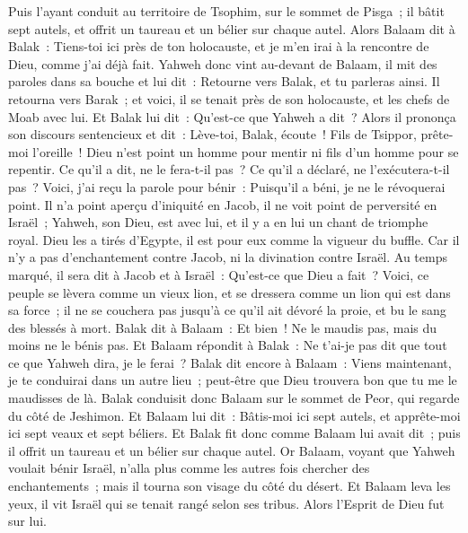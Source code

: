 \begin{multicols}{2}
Puis l'ayant conduit au territoire de Tsophim, sur le sommet de Pisga~; il bâtit sept autels, et offrit un taureau et un bélier sur chaque autel.
Alors Balaam dit à Balak~: Tiens-toi ici près de ton holocauste, et je m'en irai à la rencontre de Dieu, comme j'ai déjà fait.
Yahweh donc vint au-devant de Balaam, il mit des paroles dans sa bouche et lui dit~: Retourne vers Balak, et tu parleras ainsi.
Il retourna vers Barak~; et voici, il se tenait près de son holocauste, et les chefs de Moab avec lui. Et Balak lui dit~: Qu'est-ce que Yahweh a dit~?
Alors il prononça son discours sentencieux et dit~: Lève-toi, Balak, écoute~! Fils de Tsippor, prête-moi l'oreille~!
Dieu n'est point un homme pour mentir ni fils d'un homme pour se repentir. Ce qu'il a dit, ne le fera-t-il pas~? Ce qu'il a déclaré, ne l'exécutera-t-il pas~?
Voici, j'ai reçu la parole pour bénir~: Puisqu'il a béni, je ne le révoquerai point.
Il n'a point aperçu d'iniquité en Jacob, il ne voit point de perversité en Israël~; Yahweh, son Dieu, est avec lui, et il y a en lui un chant de triomphe royal.
Dieu les a tirés d'Egypte, il est pour eux comme la vigueur du buffle.
 Car il n'y a pas d'enchantement contre Jacob, ni la divination contre Israël. Au temps marqué, il sera dit à Jacob et à Israël~: Qu'est-ce que Dieu a fait~?
Voici, ce peuple se lèvera comme un vieux lion, et se dressera comme un lion qui est dans sa force~; il ne se couchera pas jusqu'à ce qu'il ait dévoré la proie, et bu le sang des blessés à mort.
Balak dit à Balaam~: Et bien~! Ne le maudis pas, mais du moins ne le bénis pas.
Et Balaam répondit à Balak~: Ne t'ai-je pas dit que tout ce que Yahweh dira, je le ferai~? 
Balak dit encore à Balaam~: Viens maintenant, je te conduirai dans un autre lieu~; peut-être que Dieu trouvera bon que tu me le maudisses de là.
Balak conduisit donc Balaam sur le sommet de Peor, qui regarde du côté de Jeshimon.
Et Balaam lui dit~: Bâtis-moi ici sept autels, et apprête-moi ici sept veaux et sept béliers.
Et Balak fit donc comme Balaam lui avait dit~; puis il offrit un taureau et un bélier sur chaque autel.
\VerseOne{}Or Balaam, voyant que Yahweh voulait bénir Israël, n'alla plus comme les autres fois chercher des enchantements~; mais il tourna son visage du côté du désert.
Et Balaam leva les yeux, il vit Israël qui se tenait rangé selon ses tribus. Alors l'Esprit de Dieu fut sur lui.

\end{multicols}
